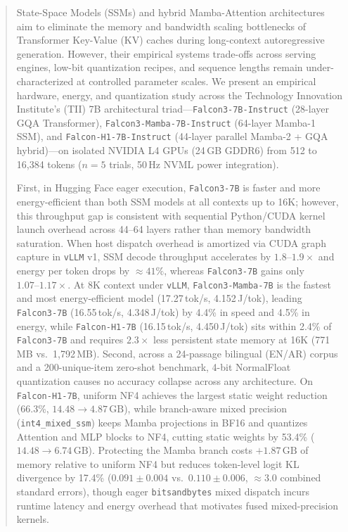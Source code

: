 \documentclass[10pt,a4paper]{article}
\begin{document}
\begin{abstract}
\small
\noindent
State-Space Models (SSMs) and hybrid Mamba-Attention architectures aim to eliminate the memory and bandwidth scaling bottlenecks of Transformer Key-Value (KV) caches during long-context autoregressive generation. However, their empirical systems trade-offs across serving engines, low-bit quantization recipes, and sequence lengths remain under-characterized at controlled parameter scales. We present an empirical hardware, energy, and quantization study across the Technology Innovation Institute's (TII) 7B architectural triad---\texttt{Falcon3-7B-Instruct} (28-layer GQA Transformer), \texttt{Falcon3-Mamba-7B-Instruct} (64-layer Mamba-1 SSM), and \texttt{Falcon-H1-7B-Instruct} (44-layer parallel Mamba-2 + GQA hybrid)---on isolated NVIDIA L4 GPUs (24\,GB GDDR6) from 512 to 16,384 tokens ($n=5$ trials, 50\,Hz NVML power integration).

First, in Hugging Face eager execution, \texttt{Falcon3-7B} is faster and more energy-efficient than both SSM models at all contexts up to 16K; however, this throughput gap is consistent with sequential Python/CUDA kernel launch overhead across 44--64 layers rather than memory bandwidth saturation. When host dispatch overhead is amortized via CUDA graph capture in \texttt{vLLM} v1, SSM decode throughput accelerates by $1.8\text{--}1.9\times$ and energy per token drops by $\approx 41\%$, whereas \texttt{Falcon3-7B} gains only $1.07\text{--}1.17\times$. At 8K context under \texttt{vLLM}, \texttt{Falcon3-Mamba-7B} is the fastest and most energy-efficient model (17.27\,tok/s, 4.152\,J/tok), leading \texttt{Falcon3-7B} (16.55\,tok/s, 4.348\,J/tok) by 4.4\% in speed and 4.5\% in energy, while \texttt{Falcon-H1-7B} (16.15\,tok/s, 4.450\,J/tok) sits within 2.4\% of \texttt{Falcon3-7B} and requires $2.3\times$ less persistent state memory at 16K (771\,MB vs.\ 1,792\,MB). Second, across a 24-passage bilingual (EN/AR) corpus and a 200-unique-item zero-shot benchmark, 4-bit NormalFloat quantization causes no accuracy collapse across any architecture. On \texttt{Falcon-H1-7B}, uniform NF4 achieves the largest static weight reduction (66.3\%, $14.48 \to 4.87\,\text{GB}$), while branch-aware mixed precision (\texttt{int4\_mixed\_ssm}) keeps Mamba projections in BF16 and quantizes Attention and MLP blocks to NF4, cutting static weights by 53.4\% ($14.48 \to 6.74\,\text{GB}$). Protecting the Mamba branch costs $+1.87\,\text{GB}$ of memory relative to uniform NF4 but reduces token-level logit KL divergence by 17.4\% ($0.091 \pm 0.004$ vs.\ $0.110 \pm 0.006$, $\approx 3.0$ combined standard errors), though eager \texttt{bitsandbytes} mixed dispatch incurs runtime latency and energy overhead that motivates fused mixed-precision kernels.
\end{abstract}
\end{document}
